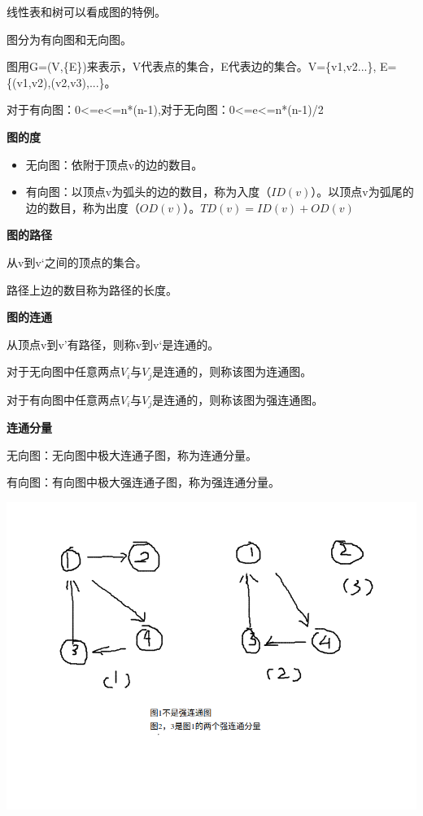\documentclass{article}
\begin{document}
		线性表和树可以看成图的特例。

		图分为有向图和无向图。

		图用G=(V,\{E\})来表示，V代表点的集合，E代表边的集合。V=\{v1,v2...\},
		E=\{(v1,v2),(v2,v3),...\}。

		对于有向图：0<=e<=n*(n-1),对于无向图：0<=e<=n*(n-1)/2

		\textbf{图的度}
		\begin{itemize}
			\item 无向图：依附于顶点v的边的数目。
			\item 有向图：以顶点v为弧头的边的数目，称为入度（$ID(v)$）。以顶点v为弧尾的边的数目，称为出度（$OD(v)$）。$TD(v)=ID(v)+OD(v)$
		\end{itemize}

		\textbf{图的路径}

		从v到v‘之间的顶点的集合。

		路径上边的数目称为路径的长度。

		\textbf{图的连通}

		从顶点v到v’有路径，则称v到v‘是连通的。

		对于无向图中任意两点$V_i$与$V_j$是连通的，则称该图为连通图。

		对于有向图中任意两点$V_i$与$V_j$是连通的，则称该图为强连通图。

		\textbf{连通分量}

		无向图：无向图中极大连通子图，称为连通分量。

		有向图：有向图中极大强连通子图，称为强连通分量。

		\includegraphics[scale=0.4]{./pic/graph-01.png}
\end{document}
